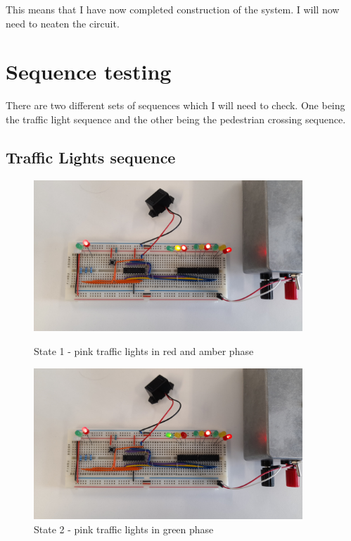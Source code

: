 \noindent This means that I have now completed construction of the system. I will now need to neaten the circuit.


\section{Sequence testing}
There are two different sets of sequences which I will need to check. One being the traffic light sequence and the other being the pedestrian crossing sequence.
\subsection{Traffic Lights sequence}
\begin{figure}[H]
    \begin{minipage}{0.45\textwidth}
        \centering
        \includegraphics[width=0.9\textwidth]{images/final-testing/state_1.jpg}
        \caption{State 1 - pink traffic lights in red and amber phase}
        \label{fig:state_1}
    \end{minipage}\hfill
    \begin{minipage}{0.45\textwidth}
        \centering
        \includegraphics[width=0.9\textwidth]{images/final-testing/state_2.jpg}
        \caption{State 2 - pink traffic lights in green phase}
        \label{fig:state_2}
    \end{minipage}
\end{figure}
